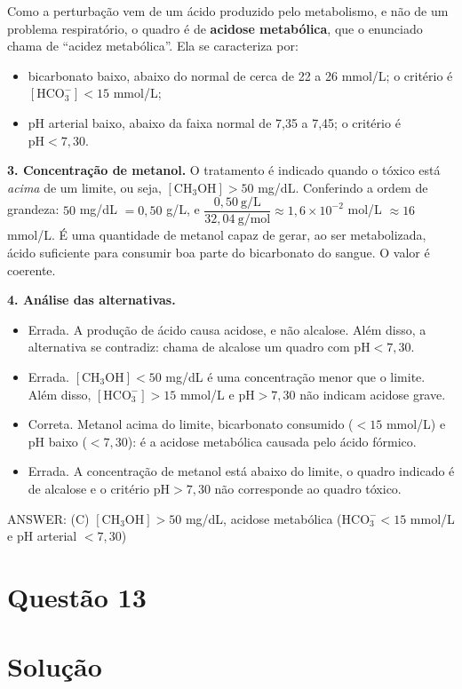 \documentclass{article}%
\begin{document}
Como a perturbação vem de um ácido produzido pelo metabolismo, e não de um problema respiratório, o quadro é de \textbf{acidose metabólica}, que o enunciado chama de ``acidez metabólica''. Ela se caracteriza por:
\begin{itemize}
\item bicarbonato baixo, abaixo do normal de cerca de 22 a 26 mmol/L; o critério é $[\mathrm{HCO_3^-}] < 15$ mmol/L;
\item pH arterial baixo, abaixo da faixa normal de 7,35 a 7,45; o critério é $\mathrm{pH} < 7{,}30$.
\end{itemize}

\textbf{3. Concentração de metanol.} O tratamento é indicado quando o tóxico está \emph{acima} de um limite, ou seja, $[\mathrm{CH_3OH}] > 50$ mg/dL. Conferindo a ordem de grandeza: $50$ mg/dL $= 0{,}50$ g/L, e $\dfrac{0{,}50\ \text{g/L}}{32{,}04\ \text{g/mol}} \approx 1{,}6\times10^{-2}$ mol/L $\approx 16$ mmol/L. É uma quantidade de metanol capaz de gerar, ao ser metabolizada, ácido suficiente para consumir boa parte do bicarbonato do sangue. O valor é coerente.

\textbf{4. Análise das alternativas.}
\begin{itemize}
\item[a)] Errada. A produção de ácido causa acidose, e não alcalose. Além disso, a alternativa se contradiz: chama de alcalose um quadro com $\mathrm{pH}<7{,}30$.
\item[b)] Errada. $[\mathrm{CH_3OH}]<50$ mg/dL é uma concentração menor que o limite. Além disso, $[\mathrm{HCO_3^-}]>15$ mmol/L e $\mathrm{pH}>7{,}30$ não indicam acidose grave.
\item[c)] Correta. Metanol acima do limite, bicarbonato consumido ($<15$ mmol/L) e pH baixo ($<7{,}30$): é a acidose metabólica causada pelo ácido fórmico.
\item[d)] Errada. A concentração de metanol está abaixo do limite, o quadro indicado é de alcalose e o critério $\mathrm{pH}>7{,}30$ não corresponde ao quadro tóxico.
\end{itemize}

ANSWER: (C) $[\mathrm{CH_3OH}] > 50$ mg/dL, acidose metabólica ($\mathrm{HCO_3^-} < 15$ mmol/L e pH arterial $< 7{,}30$)%
\newpage%
\section*{Questão 13}

\section*{Solução}
\end{document}
